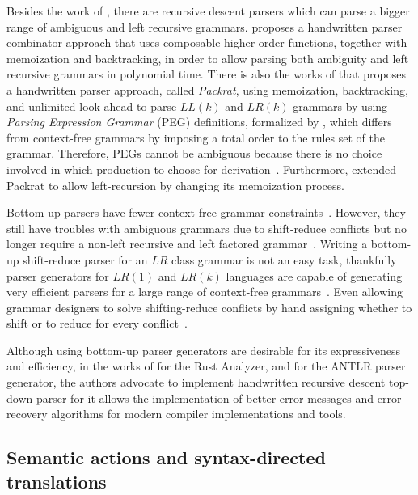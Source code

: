 \documentclass[
  oneside,
  english,
  coorientadorbanca,
  noabntexcite
]{ufsc-thesis-rn46-2019}
\begin{document}
Besides the work of \textcite{pratt1973operatorprecedence}, there are recursive descent parsers which can parse a bigger range of ambiguous and left recursive grammars.
\textcite{10.1007/978-3-540-77442-6_12} proposes a handwritten parser combinator approach that uses composable higher-order functions, together with memoization and backtracking, in order to allow parsing both ambiguity and left recursive grammars in polynomial time.
There is also the works of \textcite{10.1145/583852.581483} that proposes a handwritten parser approach, called \textit{Packrat}, using memoization, backtracking, and unlimited look ahead to parse $LL(k)$ and $LR(k)$ grammars by using \textit{Parsing Expression Grammar} (PEG) definitions, formalized by \textcite{10.1145/982962.964011}, which differs from context-free grammars by imposing a total order to the rules set of the grammar.
Therefore, PEGs cannot be ambiguous because there is no choice involved in which production to choose for derivation~\cite{10.1145/982962.964011}.
Furthermore, \textcite{10.1145/1328408.1328424} extended Packrat to allow left-recursion by changing its memoization process.

Bottom-up parsers have fewer context-free grammar constraints~\cite{Aho:2006:CPT:1177220}.
However, they still have troubles with ambiguous grammars due to shift-reduce conflicts but no longer require a non-left recursive and left factored grammar~\cite{Aho:2006:CPT:1177220}.
Writing a bottom-up shift-reduce parser for an $LR$ class grammar is not an easy task, thankfully
parser generators for $LR(1)$ and $LR(k)$ languages are capable of generating very efficient parsers for a large range of context-free grammars~\cite{Aho:2006:CPT:1177220}.
Even allowing grammar designers to solve shifting-reduce conflicts by hand assigning whether to shift or to reduce for every conflict~\cite{Aho:2006:CPT:1177220}.

Although using bottom-up parser generators are desirable for its expressiveness and efficiency, in the works of \textcite{matklad2020challenginglrparsing, matklad2020prattparsing} for the Rust Analyzer, and \textcite{Parr13} for the ANTLR parser generator, the authors advocate to implement handwritten recursive descent top-down parser for it allows the implementation of better error messages and error recovery algorithms for modern compiler implementations and tools.

\subsection{Semantic actions and syntax-directed translations}
\end{document}

